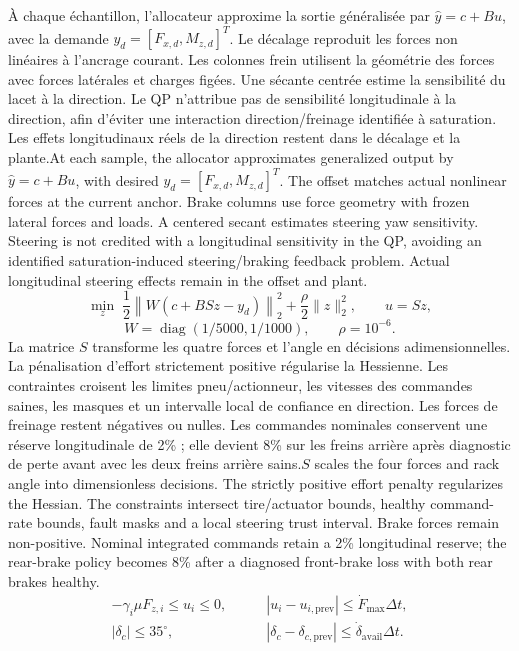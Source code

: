 \documentclass[11pt,a4paper,oneside]{report}
\newcommand{\bi}[2]{\iffrench #2\else #1\fi}
\begin{document}
\bi{At each sample, the allocator approximates generalized output by $\hat y=c+Bu$, with desired $y_d=[F_{x,d},M_{z,d}]^T$. The offset matches actual nonlinear forces at the current anchor. Brake columns use force geometry with frozen lateral forces and loads. A centered secant estimates steering yaw sensitivity. Steering is not credited with a longitudinal sensitivity in the QP, avoiding an identified saturation-induced steering/braking feedback problem. Actual longitudinal steering effects remain in the offset and plant.}{À chaque échantillon, l'allocateur approxime la sortie généralisée par $\hat y=c+Bu$, avec la demande $y_d=[F_{x,d},M_{z,d}]^T$. Le décalage reproduit les forces non linéaires à l'ancrage courant. Les colonnes frein utilisent la géométrie des forces avec forces latérales et charges figées. Une sécante centrée estime la sensibilité du lacet à la direction. Le QP n'attribue pas de sensibilité longitudinale à la direction, afin d'éviter une interaction direction/freinage identifiée à saturation. Les effets longitudinaux réels de la direction restent dans le décalage et la plante.}
\[
\min_z\;\frac12\left\|W(c+B S z-y_d)\right\|_2^2+\frac{\rho}{2}\|z\|_2^2,
\qquad u=Sz,
\]
\[
W=\operatorname{diag}(1/5000,1/1000),\qquad \rho=10^{-6}.
\]
\bi{$S$ scales the four forces and rack angle into dimensionless decisions. The strictly positive effort penalty regularizes the Hessian. The constraints intersect tire/actuator bounds, healthy command-rate bounds, fault masks and a local steering trust interval. Brake forces remain non-positive. Nominal integrated commands retain a 2\% longitudinal reserve; the rear-brake policy becomes 8\% after a diagnosed front-brake loss with both rear brakes healthy.}{La matrice $S$ transforme les quatre forces et l'angle en décisions adimensionnelles. La pénalisation d'effort strictement positive régularise la Hessienne. Les contraintes croisent les limites pneu/actionneur, les vitesses des commandes saines, les masques et un intervalle local de confiance en direction. Les forces de freinage restent négatives ou nulles. Les commandes nominales conservent une réserve longitudinale de 2\% ; elle devient 8\% sur les freins arrière après diagnostic de perte avant avec les deux freins arrière sains.}
\begin{align*}
-\gamma_i\mu F_{z,i}\le u_i\le0,&\qquad |u_i-u_{i,\mathrm{prev}}|\le\dot F_{\max}\Delta t,\\
|\delta_c|\le35^\circ,&\qquad |\delta_c-\delta_{c,\mathrm{prev}}|\le\dot\delta_{\mathrm{avail}}\Delta t.
\end{align*}
\end{document}
